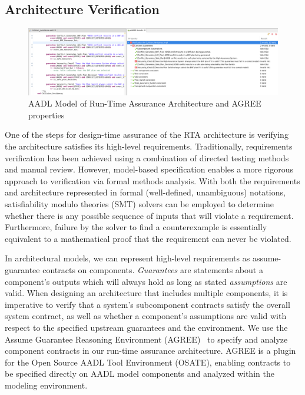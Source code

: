 \subsection{Architecture Verification}

\begin{figure}
	\centering
	\includegraphics[width=\textwidth]{figures/rta-agree-v2.jpg}
	\caption{AADL Model of Run-Time Assurance Architecture and AGREE properties}
	\label{fig:rta-agree}
\end{figure}

One of the steps for design-time assurance of the RTA architecture is verifying the architecture satisfies its high-level requirements.  Traditionally, requirements verification has been achieved using a combination of directed testing methods and manual review. However, model-based specification enables a more rigorous approach to verification via formal methods analysis. With both the requirements and architecture represented in formal (well-defined, unambiguous) notations, satisfiability modulo theories (SMT) solvers can be employed to determine whether there is any possible sequence of inputs that will violate a requirement.  Furthermore, failure by the solver to find a counterexample is essentially equivalent to a mathematical proof that the requirement can never be violated.  

In architectural models, we can represent high-level requirements as assume-guarantee contracts on components.  \textit{Guarantees} are statements about a component's outputs which will always hold as long as stated \textit{assumptions} are valid.  When designing an architecture that includes multiple components, it is imperative to verify that a system's subcomponent contracts satisfy the overall system contract, as well as whether a component's assumptions are valid with respect to the specified upstream guarantees and the environment.
%
We use the Assume Guarantee Reasoning Environment (AGREE)~\cite{agree2012} to specify and analyze component contracts in our run-time assurance architecture.  AGREE is a plugin for the Open Source AADL Tool Environment (OSATE), enabling contracts to be specified directly on AADL model components and analyzed within the modeling environment.

